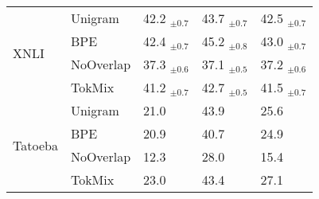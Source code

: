 \begin{table}
\begin{tabular}{lllll}
\cline{1-5}
\multirow{4}{*}{XNLI} & Unigram &  42.2 $_{\pm0.7}$ &  43.7 $_{\pm0.7}$ &  42.5 $_{\pm0.7}$ \\
        & BPE &  42.4 $_{\pm0.7}$ &  45.2 $_{\pm0.8}$ &  43.0 $_{\pm0.7}$ \\
        & NoOverlap &  37.3 $_{\pm0.6}$ &  37.1 $_{\pm0.5}$ &  37.2 $_{\pm0.6}$ \\
        & TokMix &  41.2 $_{\pm0.7}$ &  42.7 $_{\pm0.5}$ &  41.5 $_{\pm0.7}$ \\
\cline{1-5}
\multirow{4}{*}{Tatoeba} & Unigram &              21.0 &              43.9 &              25.6 \\
        & BPE &              20.9 &              40.7 &              24.9 \\
        & NoOverlap &              12.3 &              28.0 &              15.4 \\
        & TokMix &              23.0 &              43.4 &              27.1 \\
\bottomrule
\end{tabular}
\end{table}
